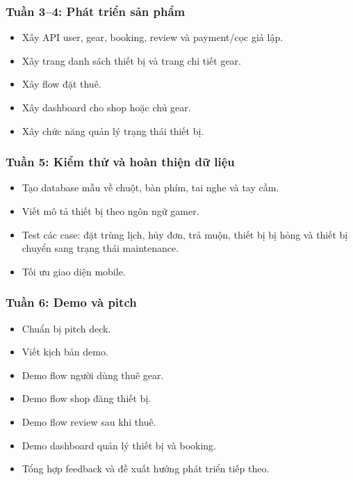 \subsubsection{Tuần 3--4: Phát triển sản phẩm}

\begin{itemize}
    \item Xây API user, gear, booking, review và payment/cọc giả lập.
    \item Xây trang danh sách thiết bị và trang chi tiết gear.
    \item Xây flow đặt thuê.
    \item Xây dashboard cho shop hoặc chủ gear.
    \item Xây chức năng quản lý trạng thái thiết bị.
\end{itemize}

\subsubsection{Tuần 5: Kiểm thử và hoàn thiện dữ liệu}

\begin{itemize}
    \item Tạo database mẫu về chuột, bàn phím, tai nghe và tay cầm.
    \item Viết mô tả thiết bị theo ngôn ngữ gamer.
    \item Test các case: đặt trùng lịch, hủy đơn, trả muộn, thiết bị bị hỏng và thiết bị chuyển sang trạng thái maintenance.
    \item Tối ưu giao diện mobile.
\end{itemize}

\subsubsection{Tuần 6: Demo và pitch}

\begin{itemize}
    \item Chuẩn bị pitch deck.
    \item Viết kịch bản demo.
    \item Demo flow người dùng thuê gear.
    \item Demo flow shop đăng thiết bị.
    \item Demo flow review sau khi thuê.
    \item Demo dashboard quản lý thiết bị và booking.
    \item Tổng hợp feedback và đề xuất hướng phát triển tiếp theo.
\end{itemize}

